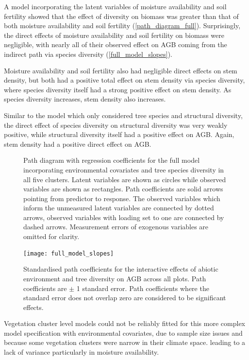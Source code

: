 \documentclass[11pt,a4paper]{article}
\begin{document}
A model incorporating the latent variables of moisture availability and soil fertility showed that the effect of diversity on biomass was greater than that of both moisture availability and soil fertility (\autoref{path_diagram_full}). Surprisingly, the direct effects of moisture availability and soil fertility on biomass were negligible, with nearly all of their observed effect on AGB coming from the indirect path via species diversity (\autoref{full_model_slopes}). 

Moisture availability and soil fertility also had negligible direct effects on stem density, but both had a positive total effect on stem density via species diversity, where species diversity itself had a strong positive effect on stem density. As species diversity increases, stem density also increases. 

Similar to the model which only considered tree species and structural diversity, the direct effect of species diversity on structural diversity was very weakly positive, while structural diversity itself had a positive effect on AGB. Again, stem density had a positive direct effect on AGB.

\begin{figure}[H]
\centering
	
	\caption{Path diagram with regression coefficients for the full model incorporating environmental covariates and tree species diversity in all five clusters. Latent variables are shown as circles while observed variables are shown as rectangles. Path coefficients are solid arrows pointing from predictor to response. The observed variables which inform the unmeasured latent variables are connected by dotted arrows, observed variables with loading set to one are connected by dashed arrows. Measurement errors of exogenous variables are omitted for clarity.}
	\label{full_mod}
\end{figure}

\begin{figure}[H]
\centering
	\texttt{[image: full\_model\_slopes]}
	\caption{Standardised path coefficients for the interactive effects of abiotic environment and tree diversity on AGB across all plots. Path coefficients are $\pm$ 1 standard error. Path coefficients where the standard error does not overlap zero are considered to be significant effects.}
	\label{full_model_slopes}
\end{figure}


Vegetation cluster level models could not be reliably fitted for this more complex model specification with environmental covariates, due to sample size issues and because some vegetation clusters were narrow in their climate space. leading to a lack of variance particularly in moisture availability.
\end{document}
